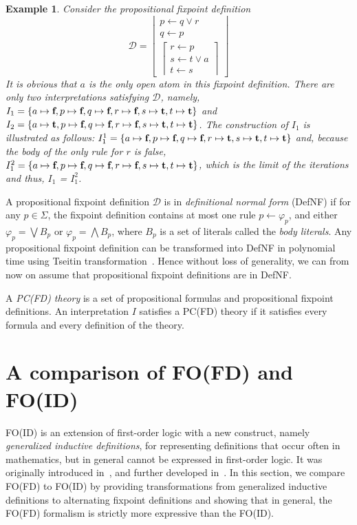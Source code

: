 \documentclass{tlp}
\newcommand{\Tr}{\mbox{\bf t}}
\newcommand{\Fa}{\mbox{\bf f}}
\newcommand{\rul}{\leftarrow}
\newcommand{\lfd}[1]{\ensuremath{\left \lfloor \begin{array}{l}#1\end{array} \right \rfloor }}
\newcommand{\gfd}[1]{\ensuremath{\left \lceil \begin{array}{l}#1\end{array} \right \rceil}}
\newcommand{\FD}{\ensuremath{\mathcal{D}}\xspace}
\newcommand{\Voc}{\ensuremath{\Sigma}\xspace}
\newtheorem{example}[lemma]{Example}
\begin{document}
\begin{example} \label{ex:propositionalfixpoint}
Consider the propositional fixpoint definition
$$\FD =
\lfd{p\rul q \lor r\\
q \rul p \\
\gfd{r \rul p\\
     s \rul t \lor a \\
     t \rul s}}$$
It is obvious that $a$ is the only open atom in this fixpoint definition. There are only two interpretations satisfying $\FD$, namely, $I_1 = \{ a \mapsto \Fa, p \mapsto \Fa, q \mapsto \Fa, r \mapsto \Fa, s \mapsto \Tr, t \mapsto \Tr\}$ and $I_2 = \{ a \mapsto \Tr, p \mapsto \Fa, q \mapsto \Fa, r \mapsto \Fa, s \mapsto \Tr, t \mapsto \Tr \}$. The construction of $I_1$ is illustrated as follows: $I_{1}^{1} = \{ a \mapsto \Fa, p \mapsto \Fa, q \mapsto \Fa, r \mapsto \Tr, s \mapsto \Tr, t \mapsto \Tr \}$ and, because the body of the only rule for $r$ is false, $I_{1}^{2} = \{a \mapsto \Fa, p \mapsto \Fa, q \mapsto \Fa, r \mapsto \Fa, s \mapsto \Tr, t \mapsto \Tr \}$, which is the limit of the iterations and thus, $I_1$ = $I_1^{2}$.
\end{example}

A propositional fixpoint definition $\FD$ is in {\em definitional normal form} (DefNF) if for any $p \in \Voc$, the fixpoint definition contains at most one rule $p \rul \varphi_p$, and either $\varphi_p = \bigvee B_p$ or $\varphi_p = \bigwedge B_p$, where $B_p$ is a set of literals called the {\em body literals}. Any propositional fixpoint definition can be transformed into DefNF in polynomial time using Tseitin transformation~\cite{Tseitin68eng}. Hence without loss of generality, we can from now on assume that propositional fixpoint definitions are in DefNF.

A {\em PC(FD) theory} is a set of propositional formulas and propositional fixpoint definitions. An interpretation $I$ satisfies a PC(FD) theory if it satisfies every formula and every definition of the theory.

\section{A comparison of FO(FD) and FO(ID)}\label{sec:gid}
FO(ID) is an extension of first-order logic with a new construct, namely {\em generalized inductive definitions}, for representing definitions that occur often in mathematics, but in general cannot be expressed in first-order logic. It was originally introduced in~\cite{Denecker:CL2000}, and further developed in~\cite{tocl/DeneckerT08}. In this section, we compare FO(FD) to FO(ID) by providing transformations from generalized inductive definitions to alternating fixpoint definitions and showing that in general, the FO(FD) formalism is strictly more expressive than the FO(ID).
\end{document}
